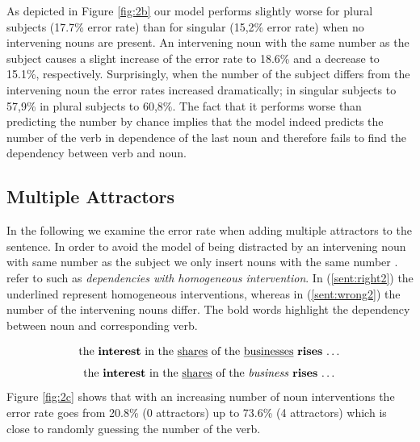 \documentclass[twoside]{article}
\begin{document}
\begin{multicols}{2}
As depicted in Figure \ref{fig:2b} our model performs slightly worse for plural subjects (17.7\% error rate) than for singular (15,2\% error rate) when no intervening nouns are present. An intervening noun with the same number as the subject causes a slight increase of the error rate to 18.6\% and a decrease to 15.1\%, respectively. Surprisingly, when the number of the subject differs from the intervening noun the error rates increased dramatically; in singular subjects to 57,9\% in plural subjects to 60,8\%. The fact that it performs worse than predicting the number by chance implies that the model indeed predicts the number of the verb in dependence of the last noun and therefore fails to find the dependency between verb and noun.

\subsection{Multiple Attractors}

In the following we examine the error rate when adding multiple attractors to the sentence. In order to avoid the model of being distracted by an intervening noun with same number as the subject we only insert nouns with the same number . \citep{Linzen2016} refer to such as  \textit{ dependencies with homogeneous intervention}. In (\ref{sent:right2}) the underlined represent homogeneous interventions, whereas in (\ref{sent:wrong2}) the number of the intervening nouns differ. The bold words highlight the dependency between noun and corresponding verb.

\begin{equation}
	\label{sent:right2}
	\textnormal{the \textbf{interest} in the \underline{shares} of the \underline{businesses} \textbf{rises} \dots}
\end{equation}
\begin{equation}
	\label{sent:wrong2}
	\textnormal{the \textbf{interest} in the \underline{shares} of the \textit{business} \textbf{rises} \dots}
\end{equation}
Figure \ref{fig:2c} shows that with an increasing number of noun interventions the error rate goes from 20.8\% (0 attractors) up to 73.6\% (4 attractors) which is close to randomly guessing the number of the verb. 







\end{multicols}
\end{document}
